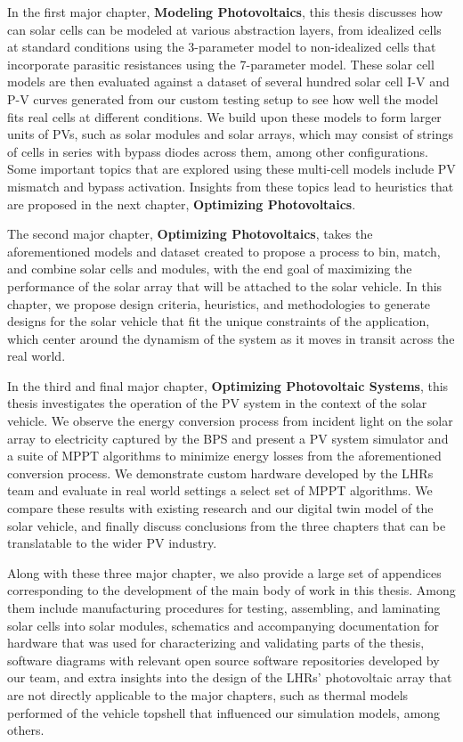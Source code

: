 In the first major chapter, \textbf{Modeling Photovoltaics}, this thesis
discusses how can solar cells can be modeled at various abstraction layers, from
idealized cells at standard conditions using the 3-parameter model to
non-idealized cells that incorporate parasitic resistances using the 7-parameter
model. These solar cell models are then evaluated against a dataset of several
hundred solar cell \ac{I-V} and \ac{P-V} curves generated from our custom
testing setup to see how well the model fits real cells at different conditions.
We build upon these models to form larger units of \ac{PV}s, such as solar
modules and solar arrays, which may consist of strings of cells in series with
bypass diodes across them, among other configurations. Some important topics
that are explored using these multi-cell models include \ac{PV} mismatch and
bypass activation. Insights from these topics lead to heuristics that are
proposed in the next chapter, \textbf{Optimizing Photovoltaics}.

The second major chapter, \textbf{Optimizing Photovoltaics}, takes the
aforementioned models and dataset created to propose a process to bin, match,
and combine solar cells and modules, with the end goal of maximizing the
performance of the solar array that will be attached to the solar vehicle. In
this chapter, we propose design criteria, heuristics, and methodologies to
generate designs for the solar vehicle that fit the unique constraints of the
application, which center around the dynamism of the system as it moves in
transit across the real world.

In the third and final major chapter, \textbf{Optimizing Photovoltaic
Systems}, this thesis investigates the operation of the \ac{PV}
system in the context of the solar vehicle. We observe the energy conversion
process from incident light on the solar array to electricity captured by the
\ac{BPS} and present a \ac{PV} system simulator and a suite of \ac{MPPT}
algorithms to minimize energy losses from the aforementioned conversion process.
We demonstrate custom hardware developed by the \ac{LHRs} team and evaluate in
real world settings a select set of \ac{MPPT} algorithms. We compare these
results with existing research and our digital twin model of the solar vehicle,
and finally discuss conclusions from the three chapters that can be translatable
to the wider \ac{PV} industry.

Along with these three major chapter, we also provide a large set of appendices
corresponding to the development of the main body of work in this thesis. Among
them include manufacturing procedures for testing, assembling, and laminating
solar cells into solar modules, schematics and accompanying documentation for
hardware that was used for characterizing and validating parts of the thesis,
software diagrams with relevant open source software repositories developed by
our team, and extra insights into the design of the \ac{LHRs}' photovoltaic
array that are not directly applicable to the major chapters, such as thermal
models performed of the vehicle topshell that influenced our simulation models,
among others.
